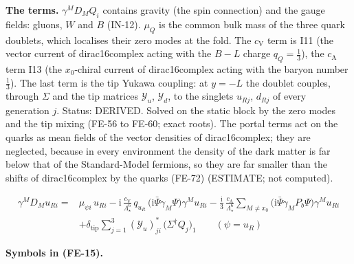 \documentclass[
  10pt,
]{article}
\begin{document}
\textbf{The terms.} \(\gamma^MD_MQ_i\) contains gravity (the spin
connection) and the gauge fields: gluons, \(W\) and \(B\) (IN-12).
\(\mu_Q\) is the common bulk mass of the three quark doublets, which
localises their zero modes at the fold. The \(c_{\mathrm{V}}\) term is
I11 (the vector current of dirac16complex acting with the \(B - L\)
charge \(q_Q = \frac13\)), the \(c_{\mathrm{A}}\) term I13 (the
\(x_0\)-chiral current of dirac16complex acting with the baryon number
\(\frac13\)). The last term is the tip Yukawa coupling: at \(y = -L\)
the doublet couples, through \(\Sigma\) and the tip matrices
\(\mathcal{Y}_u\), \(\mathcal{Y}_d\), to the singlets \(u_{Rj}\),
\(d_{Rj}\) of every generation \(j\). Status: DERIVED. Solved on the
static block by the zero modes and the tip mixing (FE-56 to FE-60; exact
roots). The portal terms act on the quarks as mean fields of the vector
densities of dirac16complex; they are neglected, because in every
environment the density of the dark matter is far below that of the
Standard-Model fermions, so they are far smaller than the shifts of
dirac16complex by the quarks (FE-72) (ESTIMATE; not computed).

\[
\begin{aligned}
\gamma^MD_Mu_{Ri} ={}& \mu_{\psi i}\,u_{Ri} - \mathrm{i}\,\frac{c_{\mathrm{V}}}{\Lambda_\star^6}\,q_{u_R}\,
 \big(\mathrm{i}\bar\Psi\gamma_M\Psi\big)\gamma^Mu_{Ri}
 - \frac{\mathrm{i}}{3}\,\frac{c_{\mathrm{A}}}{\Lambda_\star^6}\sum_{M\ne
 x_0}\big(\mathrm{i}\bar\Psi\gamma_MP_b\Psi\big)\gamma^Mu_{Ri}\\
 &+ \delta_{\mathrm{tip}}\sum_{j=1}^{3}(\mathcal{Y}_u)^*_{ji}\,\big(\Sigma^\dagger Q_j\big)_1\qquad
 (\psi = u_R)
\end{aligned} \tag{FE-15}
\]

\textbf{Symbols in (FE-15).}
\end{document}
